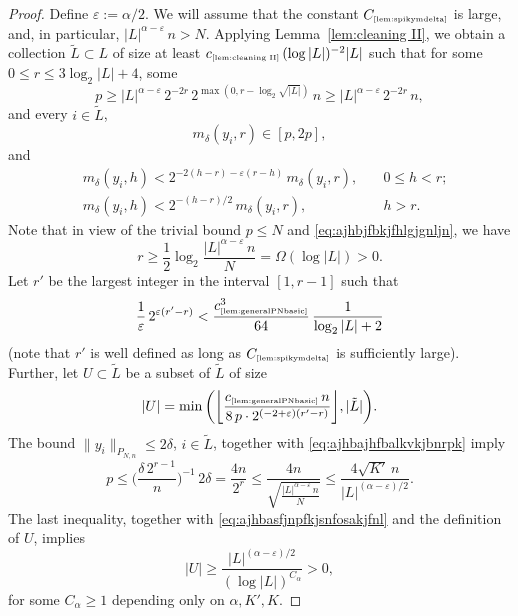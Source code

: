 \documentclass[11pt]{amsart}
\theoremstyle{definition}
\theoremstyle{plain}
\begin{document}
\begin{proof}
Define $\varepsilon:=\alpha/2$.
We will assume that the constant $C_{\text{\tiny\ref{lem:spikymdelta}}}$
is large, and, in particular,
$|L|^{\alpha-\varepsilon}\,n> N$.
Applying Lemma~\ref{lem:cleaning II},
we obtain a collection $\tilde L\subset L$
of size at least
$c_{\text{\tiny\ref{lem:cleaning II}}}\,(\log|L|)^{-2}|L|$
such that for 
some $0\leq r\leq 3\log_2|L|+4$, some
\begin{equation}\label{eq:ajhbjfbkjfhlgjgnljn}
p\geq 
|L|^{\alpha-\varepsilon}\,2^{-2r}\,
2^{\max(0,r-\log_2\sqrt{|L|})}\,n
\geq |L|^{\alpha-\varepsilon}\,2^{-2r}\,n,    
\end{equation}
and
every $i\in\tilde L$,
$$
m_\delta(y_i,r)\in[p,2p],
$$
and
\begin{align*}
&m_\delta(y_i,h)
< 2^{-2(h-r)-\varepsilon(r-h)}\,m_\delta(y_i,r),
\quad
&0\leq h< r;\\
&m_\delta(y_i,h)
< 2^{-(h-r)/2}\,m_\delta(y_i,r),
\quad
&h> r.
\end{align*}
Note that in view of the trivial bound $p\leq N$ and
\eqref{eq:ajhbjfbkjfhlgjgnljn}, we have
\begin{equation}\label{eq:ajhbajhfbalkvkjbnrpk}
r\geq \frac{1}{2}\log_2\frac{|L|^{\alpha-\varepsilon}\,n}{N}
=\Omega(\log|L|)
>0.    
\end{equation}
Let $r'$ be the largest integer in the interval $[1,r-1]$ 
such that
\begin{equation}\label{eq:ajhbasfjnpfkjsnfosakjfnl}
\frac{1}{\varepsilon}
\,2^{\varepsilon(r'-r)}
<
\frac{c_{\text{\tiny\ref{lem:generalPNbasic}}}^3}{64}\,
\frac{1}{\log_2|L|+2}
\end{equation}
(note that $r'$ is well defined as long as $C_{\text{\tiny\ref{lem:spikymdelta}}}$ is sufficiently large).
Further, let $U\subset \tilde L$ be a subset of $\tilde L$
of size 
$$
|U|= \min\bigg(\bigg\lfloor 
\frac{c_{\text{\tiny\ref{lem:generalPNbasic}}}\,n}
{8\,p\cdot 2^{(-2+\varepsilon)(r'-r)}}\bigg\rfloor,|\tilde L|\bigg).
$$
The bound $\|y_i\|_{P_{N,n}}\leq 2\delta$, $i\in\tilde L$,
together with \eqref{eq:ajhbajhfbalkvkjbnrpk}
imply
$$
p\leq \bigg(\frac{\delta\,2^{r-1}}{n}\bigg)^{-1}\,2\delta
=\frac{4n}{2^r}
\leq \frac{4n}{\sqrt{\frac{|L|^{\alpha-\varepsilon}\,n}{N}}}
\leq \frac{4\sqrt{K'}\,n}
{|L|^{(\alpha-\varepsilon)/2}}.
$$
The last inequality, together with \eqref{eq:ajhbasfjnpfkjsnfosakjfnl}
and the definition of $U$, implies 
$$
|U|\geq \frac{|L|^{(\alpha-\varepsilon)/2}}{(\log|L|)^{C_\alpha}}>0,
$$
for some $C_\alpha\geq 1$ depending only on $\alpha,K',K$.


\end{proof}
\end{document}
